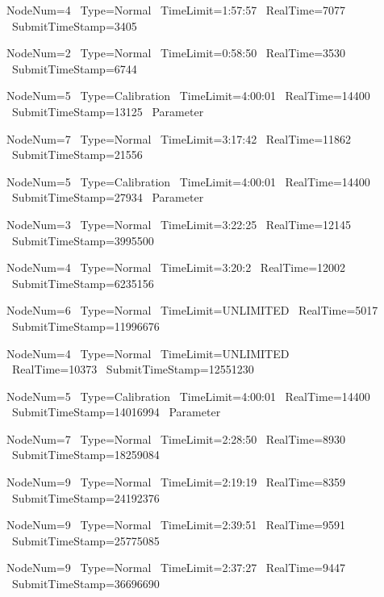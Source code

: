 \begin{description}
    
    \item[] NodeNum=4 \ Type=Normal \ TimeLimit=1:57:57 \ RealTime=7077 \ SubmitTimeStamp=3405

\item[] NodeNum=2 \ Type=Normal \ TimeLimit=0:58:50 \ RealTime=3530 \ SubmitTimeStamp=6744

\item[] NodeNum=5 \ Type=Calibration \ TimeLimit=4:00:01 \ RealTime=14400 \ SubmitTimeStamp=13125 \ Parameter

\item[] NodeNum=7 \ Type=Normal \ TimeLimit=3:17:42 \ RealTime=11862 \ SubmitTimeStamp=21556

\item[] NodeNum=5 \ Type=Calibration \ TimeLimit=4:00:01 \ RealTime=14400 \ SubmitTimeStamp=27934 \ Parameter

\item[] NodeNum=3 \ Type=Normal \ TimeLimit=3:22:25 \ RealTime=12145 \ SubmitTimeStamp=3995500

\item[] NodeNum=4 \ Type=Normal \ TimeLimit=3:20:2 \ RealTime=12002 \ SubmitTimeStamp=6235156

\item[] NodeNum=6 \ Type=Normal \ TimeLimit=UNLIMITED \ RealTime=5017 \ SubmitTimeStamp=11996676

\item[] NodeNum=4 \ Type=Normal \ TimeLimit=UNLIMITED \ RealTime=10373 \ SubmitTimeStamp=12551230

\item[] NodeNum=5 \ Type=Calibration \ TimeLimit=4:00:01 \ RealTime=14400 \ SubmitTimeStamp=14016994 \ Parameter

\item[] NodeNum=7 \ Type=Normal \ TimeLimit=2:28:50 \ RealTime=8930 \ SubmitTimeStamp=18259084

\item[] NodeNum=9 \ Type=Normal \ TimeLimit=2:19:19 \ RealTime=8359 \ SubmitTimeStamp=24192376

\item[] NodeNum=9 \ Type=Normal \ TimeLimit=2:39:51 \ RealTime=9591 \ SubmitTimeStamp=25775085

\item[] NodeNum=9 \ Type=Normal \ TimeLimit=2:37:27 \ RealTime=9447 \ SubmitTimeStamp=36696690


\end{description}

